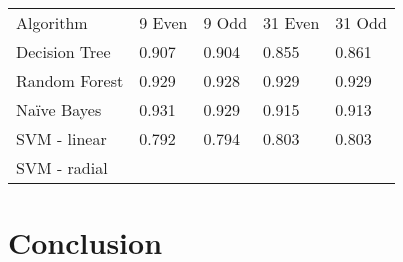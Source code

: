 \documentclass[aps, reprint, amsmath, amssymb]{revtex4-1}
\begin{document}
\begin{center}
  \begin{tabular}{ | l || l | l | l | l |}
    \hline
    Algorithm & 9 Even & 9 Odd & 31 Even & 31 Odd \\ \hhline{|=||=|=|=|=|}

    Decision Tree & 0.907 & 0.904 & 0.855 & 0.861 \\ \hline

    Random Forest & 0.929 & 0.928  & 0.929  & 0.929 \\ \hline

    Na{\"i}ve Bayes & 0.931  & 0.929 & 0.915 & 0.913 \\ \hline

    SVM - linear & 0.792 & 0.794 & 0.803 & 0.803 \\ \hline

    SVM - radial & & & & \\ 
    \hline
  \end{tabular}
\end{center}


\section{Conclusion}
\end{document}
